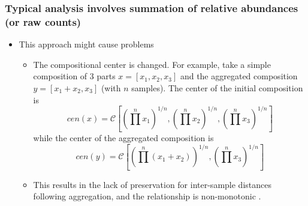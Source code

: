 \documentclass{beamer}
\begin{document}
\begin{frame}
    \frametitle{Typical analysis involves summation of relative abundances (or raw counts)}
    \begin{itemize}
        \item This approach might cause problems 
        \begin{itemize}
            \item The compositional center is changed. For example, take a simple composition of 3 parts $x = [x_1, x_2, x_3]$ and the aggregated composition $y = [x_1 + x_2, x_3]$ (with $n$ samples). The center \cite{aitchison} of the initial composition is 
            \[cen(x) = \mathcal{C}\left[ (\prod^n x_1)^{1/n}, (\prod^n x_2)^{1/n}, (\prod^n x_3)^{1/n} \right]\]
            while the center of the aggregated composition is 
            \[cen(y) = \mathcal{C}\left[ (\prod^n (x_1 + x_2))^{1/n}, (\prod^n x_3)^{1/n} \right]\]
            \item This results in the lack of preservation for inter-sample distances following aggregation, and the relationship is non-monotonic \cite{egozcue2005}.  
        \end{itemize}
    \end{itemize}
\end{frame}
\end{document}
